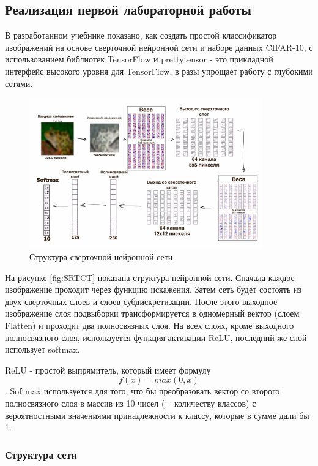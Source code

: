 \subsection{Реализация первой лабораторной работы}

В разработанном учебнике показано, как создать простой классификатор изображений на основе сверточной нейронной сети и наборе данных CIFAR-10, с использованием библиотек TensorFlow и prettytensor - это прикладной интерфейс высокого уровня для TensorFlow, в разы упрощает работу с глубокими сетями.

\begin{figure}[htbp]
	\centering
	\includegraphics[width=0.9\textwidth]{fig/cnn_my.jpg}
	\caption{Структура сверточной нейронной сети}
	\label{SRTCT}
\end{figure}

На рисунке  \ref{fig:SRTCT}  показана структура нейронной сети. Сначала каждое изображение проходит через функцию искажения. Затем сеть будет состоять из двух сверточных слоев и слоев субдискретизации. После этого выходное изображение слоя подвыборки трансформируется в одномерный вектор (слоем Flatten) и проходит два полносвязных слоя. На всех слоях, кроме выходного полносвязного слоя, используется функция активации ReLU, последний же слой использует softmax.


ReLU - простой выпрямитель, который имеет формулу  $$f(x) = max(0, x)$$. 
Softmax используется для того, что бы преобразовать вектор со второго полносвязного слоя в массив из 10 чисел (= количеству классов) с вероятностными значениями принадлежности к классу, которые в сумме дали бы 1.


\subsubsection{Структура сети}


